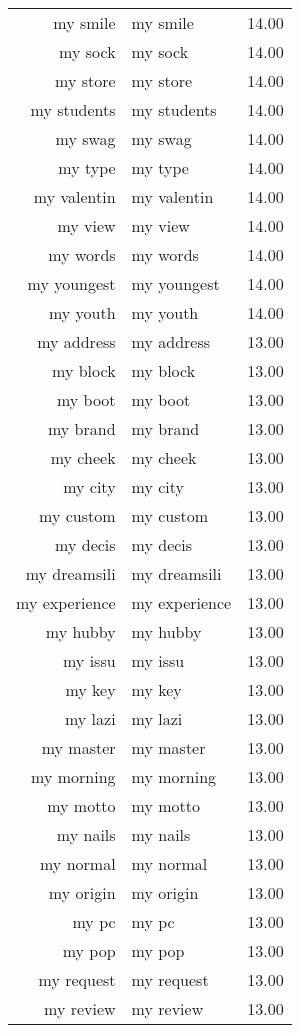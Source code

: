 \begin{table}[ht]
\begin{tabular}{rlr}
  my smile & my smile & 14.00 \\ 
  my sock & my sock & 14.00 \\ 
  my store & my store & 14.00 \\ 
  my students & my students & 14.00 \\ 
  my swag & my swag & 14.00 \\ 
  my type & my type & 14.00 \\ 
  my valentin & my valentin & 14.00 \\ 
  my view & my view & 14.00 \\ 
  my words & my words & 14.00 \\ 
  my youngest & my youngest & 14.00 \\ 
  my youth & my youth & 14.00 \\ 
  my address & my address & 13.00 \\ 
  my block & my block & 13.00 \\ 
  my boot & my boot & 13.00 \\ 
  my brand & my brand & 13.00 \\ 
  my cheek & my cheek & 13.00 \\ 
  my city & my city & 13.00 \\ 
  my custom & my custom & 13.00 \\ 
  my decis & my decis & 13.00 \\ 
  my dreamsili & my dreamsili & 13.00 \\ 
  my experience & my experience & 13.00 \\ 
  my hubby & my hubby & 13.00 \\ 
  my issu & my issu & 13.00 \\ 
  my key & my key & 13.00 \\ 
  my lazi & my lazi & 13.00 \\ 
  my master & my master & 13.00 \\ 
  my morning & my morning & 13.00 \\ 
  my motto & my motto & 13.00 \\ 
  my nails & my nails & 13.00 \\ 
  my normal & my normal & 13.00 \\ 
  my origin & my origin & 13.00 \\ 
  my pc & my pc & 13.00 \\ 
  my pop & my pop & 13.00 \\ 
  my request & my request & 13.00 \\ 
  my review & my review & 13.00 \\ 

\end{tabular}
\end{table}
